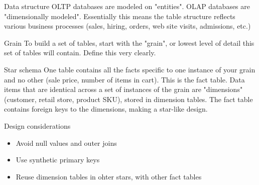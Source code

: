 \documentclass{beamer}
\begin{document}
\begin{frame}{Data structure}
    OLTP databases are modeled on "entities". OLAP databases are
    "dimensionally modeled". Essentially this means the table structure
    reflects various business processes (sales, hiring, orders, web site
    visits, admissions, etc.)
\end{frame}

\begin{frame}{Grain}
    To build a set of tables, start with the "grain", or lowest level of
    detail this set of tables will contain. Define this very clearly.
\end{frame}

\begin{frame}{Star schema}
    One table contains all the facts specific to one instance of your grain
    and no other (sale price, number of items in cart). This is the fact
    table. Data items that are identical across a set of instances of the
    grain are "dimensions" (customer, retail store, product SKU), stored in
    dimension tables. The fact table contains foreign keys to the dimensions,
    making a star-like design.
\end{frame}

\begin{frame}{Design considerations}
    \begin{itemize}
        \item Avoid null values and outer joins
        \item Use synthetic primary keys
        \item Reuse dimension tables in ohter stars, with other fact tables
    \end{itemize}
\end{frame}
\end{document}
